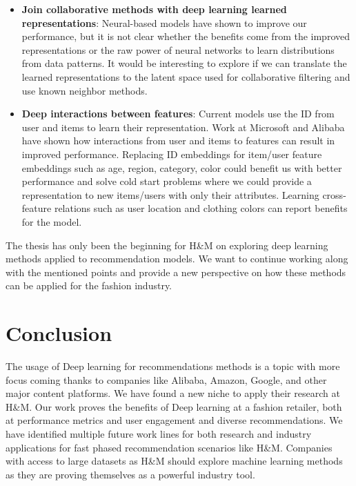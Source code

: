 \documentclass{kththesis}
\begin{document}
\begin{itemize}
    \item \textbf{Join collaborative methods with deep learning learned representations}: Neural-based models have shown to improve our performance, but it is not clear whether the benefits come from the improved representations or the raw power of neural networks to learn distributions from data patterns. It would be interesting to explore if we can translate the learned representations to the latent space used for collaborative filtering and use known neighbor methods.
    
    \item \textbf{Deep interactions between features}: Current models use the ID from user and items to learn their representation. Work at Microsoft \cite{xDeepFM} and Alibaba \cite{alibaba} have shown how interactions from user and items to features can result in improved performance. Replacing ID embeddings for item/user feature embeddings such as age, region, category, color could benefit us with better performance and solve cold start problems where we could provide a representation to new items/users with only their attributes. Learning cross-feature relations such as user location and clothing colors can report benefits for the model.
\end{itemize}

The thesis has only been the beginning for H\&M on exploring deep learning methods applied to recommendation models. We want to continue working along with the mentioned points and provide a new perspective on how these methods can be applied for the fashion industry. 

\section{Conclusion}

The usage of Deep learning for recommendations methods is a topic with more focus coming thanks to companies like Alibaba, Amazon, Google, and other major content platforms. We have found a new niche to apply their research at H\&M. Our work proves the benefits of Deep learning at a fashion retailer, both at performance metrics and user engagement and diverse recommendations. We have identified multiple future work lines for both research and industry applications for fast phased recommendation scenarios like H\&M. Companies with access to large datasets as H\&M should explore machine learning methods as they are proving themselves as a powerful industry tool.

\printbibliography
\end{document}
